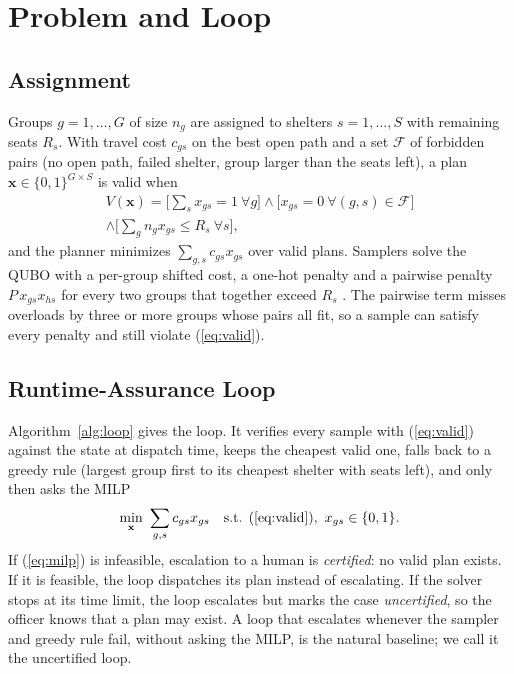 \documentclass[conference]{IEEEtran}
\begin{document}
\section{Problem and Loop}
\subsection{Assignment}
Groups $g=1,\dots,G$ of size $n_g$ are assigned to shelters $s=1,\dots,S$ with remaining seats $R_s$. With travel cost $c_{gs}$ on the best open path and a set $\mathcal F$ of forbidden pairs (no open path, failed shelter, group larger than the seats left), a plan $\mathbf x\in\{0,1\}^{G\times S}$ is valid when
\begin{multline}
V(\mathbf x)=\Big[\textstyle\sum_s x_{gs}=1\ \forall g\Big]\wedge\Big[x_{gs}=0\ \forall (g,s)\in\mathcal F\Big]\\
\wedge\Big[\textstyle\sum_g n_g x_{gs}\le R_s\ \forall s\Big],
\label{eq:valid}
\end{multline}
and the planner minimizes $\sum_{g,s}c_{gs}x_{gs}$ over valid plans. Samplers solve the QUBO with a per-group shifted cost, a one-hot penalty and a pairwise penalty $P\,x_{gs}x_{hs}$ for every two groups that together exceed $R_s$ \cite{Glover2019}. The pairwise term misses overloads by three or more groups whose pairs all fit, so a sample can satisfy every penalty and still violate (\ref{eq:valid}).

\subsection{Runtime-Assurance Loop}
Algorithm~\ref{alg:loop} gives the loop. It verifies every sample with (\ref{eq:valid}) against the state at dispatch time, keeps the cheapest valid one, falls back to a greedy rule (largest group first to its cheapest shelter with seats left), and only then asks the MILP
\begin{equation}
\min_{\mathbf x}\ \sum_{g,s}c_{gs}x_{gs}\quad\text{s.t. (\ref{eq:valid})},\ x_{gs}\in\{0,1\}.
\label{eq:milp}
\end{equation}
If (\ref{eq:milp}) is infeasible, escalation to a human is \emph{certified}: no valid plan exists. If it is feasible, the loop dispatches its plan instead of escalating. If the solver stops at its time limit, the loop escalates but marks the case \emph{uncertified}, so the officer knows that a plan may exist. A loop that escalates whenever the sampler and greedy rule fail, without asking the MILP, is the natural baseline; we call it the uncertified loop.
\end{document}
